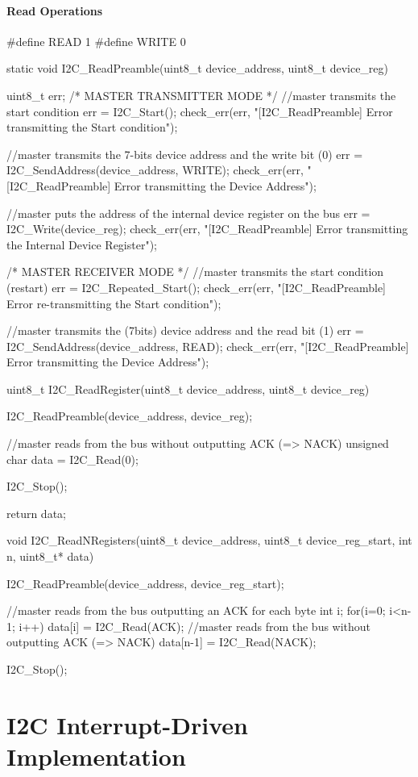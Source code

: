 \paragraph{Read Operations}
\begin{ccode}
	#define READ 1
	#define WRITE 0

	static void I2C_ReadPreamble(uint8_t device_address, uint8_t device_reg) {
		uint8_t err;
		/* MASTER TRANSMITTER MODE */
		//master transmits the start condition
		err = I2C_Start();
		check_err(err, "[I2C_ReadPreamble] Error transmitting the Start condition");
	
		//master transmits the 7-bits device address and the write bit (0)
		err = I2C_SendAddress(device_address, WRITE);
		check_err(err, "[I2C_ReadPreamble] Error transmitting the Device Address");

		//master puts the address of the internal device register on the bus
		err = I2C_Write(device_reg);
		check_err(err, "[I2C_ReadPreamble] Error transmitting the Internal Device Register");
	
		/* MASTER RECEIVER MODE */
		//master transmits the start condition (restart)
		err = I2C_Repeated_Start();
		check_err(err, "[I2C_ReadPreamble] Error re-transmitting the Start condition");
	
		//master transmits the (7bits) device address and the read bit (1)
		err = I2C_SendAddress(device_address, READ);
		check_err(err, "[I2C_ReadPreamble] Error transmitting the Device Address");
	}

	uint8_t I2C_ReadRegister(uint8_t device_address, uint8_t device_reg) {	
		I2C_ReadPreamble(device_address, device_reg);
	
		//master reads from the bus without outputting ACK (=> NACK)
		unsigned char data = I2C_Read(0);
	
		I2C_Stop();
	
		return data;
	}

	void I2C_ReadNRegisters(uint8_t device_address, uint8_t device_reg_start, int n, uint8_t* data) {
		I2C_ReadPreamble(device_address, device_reg_start);
	
		//master reads from the bus outputting an ACK for each byte
		int i;
		for(i=0; i<n-1; i++) {
			data[i] = I2C_Read(ACK);
		}
		//master reads from the bus without outputting ACK (=> NACK)
		data[n-1] = I2C_Read(NACK);
	
		I2C_Stop();
	}
\end{ccode}

\section{I2C Interrupt-Driven Implementation}

